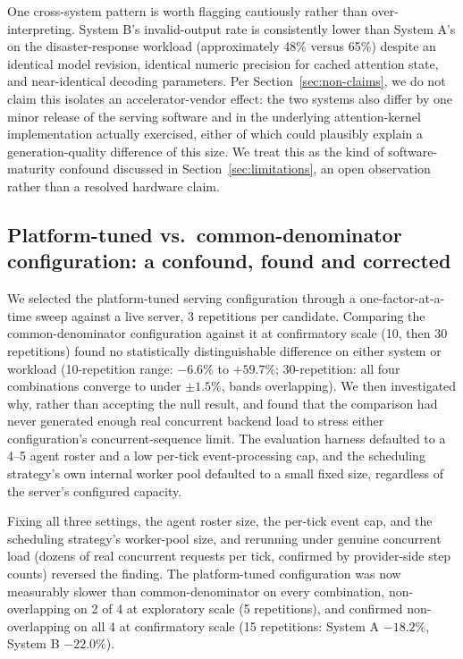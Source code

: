One cross-system pattern is worth flagging cautiously rather than over-interpreting. System B's invalid-output rate is consistently lower than System A's on the disaster-response workload (approximately 48\% versus 65\%) despite an identical model revision, identical numeric precision for cached attention state, and near-identical decoding parameters. Per Section~\ref{sec:non-claims}, we do not claim this isolates an accelerator-vendor effect: the two systems also differ by one minor release of the serving software and in the underlying attention-kernel implementation actually exercised, either of which could plausibly explain a generation-quality difference of this size. We treat this as the kind of software-maturity confound discussed in Section~\ref{sec:limitations}, an open observation rather than a resolved hardware claim.

\subsection[Platform-tuned vs.\ common-denominator: a confound, found and corrected]{Platform-tuned vs.\ common-denominator configuration: a confound, found and corrected}
\label{sec:b2-confound}

We selected the platform-tuned serving configuration through a one-factor-at-a-time sweep against a live server, 3 repetitions per candidate. Comparing the common-denominator configuration against it at confirmatory scale (10, then 30 repetitions) found no statistically distinguishable difference on either system or workload (10-repetition range: $-6.6\%$ to $+59.7\%$; 30-repetition: all four combinations converge to under $\pm 1.5\%$, bands overlapping). We then investigated why, rather than accepting the null result, and found that the comparison had never generated enough real concurrent backend load to stress either configuration's concurrent-sequence limit. The evaluation harness defaulted to a 4--5 agent roster and a low per-tick event-processing cap, and the scheduling strategy's own internal worker pool defaulted to a small fixed size, regardless of the server's configured capacity.

Fixing all three settings, the agent roster size, the per-tick event cap, and the scheduling strategy's worker-pool size, and rerunning under genuine concurrent load (dozens of real concurrent requests per tick, confirmed by provider-side step counts) reversed the finding. The platform-tuned configuration was now measurably slower than common-denominator on every combination, non-overlapping on 2 of 4 at exploratory scale (5 repetitions), and confirmed non-overlapping on all 4 at confirmatory scale (15 repetitions: System A $-18.2\%$, System B $-22.0\%$).

